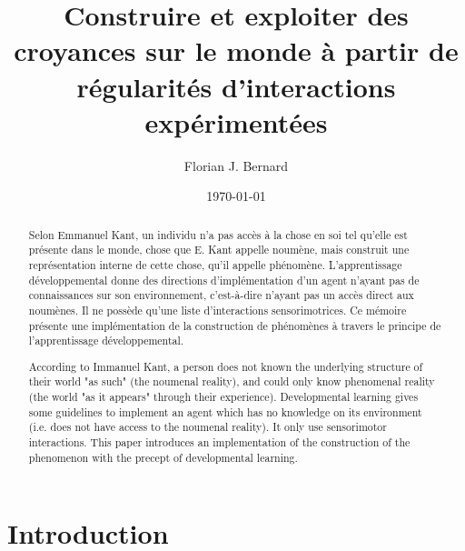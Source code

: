 \documentclass{llncs}
\title{Construire et exploiter des croyances sur le monde à partir de régularités d'interactions expérimentées}
\author{Florian J. Bernard}
\institute{LIRIS - Université Claude Bernard, Lyon 1\\\email{florian.bernard3@etu.univ-lyon1.fr}}
\date{\today}
\begin{document}
\maketitle
\vfill
\begin{abstract}
	
	 Selon Emmanuel Kant, un individu n'a pas accès à la chose en soi tel qu'elle est présente dans le monde, chose que E. Kant appelle noumène, mais construit une représentation interne de cette chose, qu'il appelle phénomène. L'apprentissage développemental donne des directions d'implémentation d'un agent n'ayant pas de connaissances sur son environnement, c'est-à-dire n'ayant pas un accès direct aux noumènes. Il ne possède qu'une liste d'interactions sensorimotrices. Ce mémoire présente une implémentation de la construction de phénomènes à travers le principe de l'apprentissage développemental.
\end{abstract}
\begin{abstract}
	According to Immanuel Kant, a person does not known the underlying structure of their world
	"as such" (the noumenal reality), and could only know phenomenal reality (the world "as it appears"
	through their experience). Developmental learning gives some guidelines to implement an agent which has no knowledge on its environment (i.e. does not have access to the noumenal reality). It only use sensorimotor interactions. This paper introduces an implementation of the construction of the phenomenon with the precept of developmental learning.
\end{abstract}

\setcounter{tocdepth}{4}
\tableofcontents
\newpage
\section{Introduction}
\end{document}
